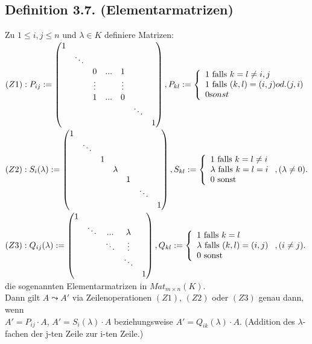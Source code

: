 \documentclass[a4paper, 12pt]{extarticle}
\newcommand{\tn}[1]{\textnormal {#1}}
\begin{document}
\subsection*{Definition 3.7. (Elementarmatrizen)}
Zu $1 \leq i,j \leq n$ und $\lambda \in K$ definiere Matrizen:\\
$(Z1): P_{ij} := \left( \begin{matrix} 
1 \\
& \ddots \\
& & 0 & ... & 1 \\
& & \vdots & & \vdots \\
& & 1 & ... & 0 \\
& & & & & \ddots \\
& & & & & & 1 \\
\end{matrix} \right), 
P_{kl} := \left \{\begin{array}{ll} 1 \tn{ falls } k = l \neq i,j \\
1 \tn{ falls } (k,l) = (i,j) od. (j,i) \\
0 \tn sonst\\
\end{array} \right.$\\
$(Z2): S_i(\lambda):= \left(\begin{matrix}
1 \\
& \ddots \\
& & 1 \\
& & & \lambda \\
& & & & 1 \\
& & & & & \ddots \\
& & & & & & 1 \\
\end{matrix} \right) ,
S_{kl} := \left \{\begin{array}{ll}
1 \tn{ falls } k = l \neq i \\
\lambda \tn{ falls } k = l = i \\
0 \tn{ sonst }
\end{array}\right. , (\lambda \neq 0).
$\\
$(Z3): Q_{ij}(\lambda) := \left(\begin{matrix}
1 \\
& \ddots & . . . & \lambda \\
& & \ddots & \vdots \\
& & &  \ddots \\
& & & &  1 \\
\end{matrix} \right) , Q_{kl} := \left \{ \begin{array}{ll}
1 \tn{ falls } k=l \\
\lambda \tn{ falls } (k,l) = (i,j)\\
0 \tn{ sonst}
\end{array} \right. , (i\neq j).
$\\
die sogenannten Elementarmatrizen in $Mat_{m \times n}(K)$.\\
Dann gilt $A \leadsto A'$ via Zeilenoperationen $(Z1)$, $(Z2)$ oder $(Z3)$ genau dann, wenn\\ 
$A' = P_{ij} \cdot A$, $A' = S_i(\lambda) \cdot A$ beziehungsweise $A' = Q_{ik}(\lambda) \cdot A$. (Addition des $\lambda$-fachen der j-ten Zeile zur i-ten Zeile.)
\end{document}
